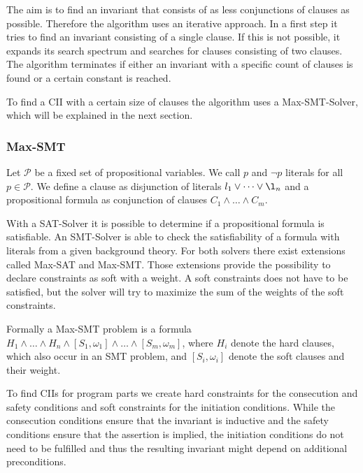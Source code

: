 The aim is to find an invariant that consists of as less conjunctions of clauses as possible.
Therefore the algorithm uses an iterative approach.
In a first step it tries to find an invariant consisting of a single clause.
If this is not possible, it expands its search spectrum and searches for clauses consisting of two clauses.
The algorithm terminates if either an invariant with a specific count of clauses is found or a certain constant is reached.



To find a CII with a certain size of clauses the algorithm uses a Max-SMT-Solver, which will be explained in the next section.

\subsubsection{Max-SMT}

Let $\mathcal{P}$ be a fixed set of propositional variables.
We call $p$ and $\neg p$ literals for all $p \in \mathcal{P}$.
We define a clause as disjunction of literals $l_1 \vee \dots \vee \l_n$ and a propositional formula as conjunction of clauses $C_1 \wedge \dots \wedge C_m$.

With a SAT-Solver it is possible to determine if a propositional formula is satisfiable.
An SMT-Solver is able to check the satisfiability of a formula with literals from a given background theory.
For both solvers there exist extensions called Max-SAT and Max-SMT.
Those extensions provide the possibility to declare constraints as soft with a weight.
A soft constraints does not have to be satisfied, but the solver will try to maximize the sum of the weights of the soft constraints.

Formally a Max-SMT problem is a formula $H_1 \wedge \dots \wedge H_n \wedge [S_1,\omega_1] \wedge \dots \wedge [S_m,\omega_m]$, where $H_i$ denote the hard clauses, which also occur in an SMT problem, and $[S_i,\omega_i]$ denote the soft clauses and their weight.

To find CIIs for program parts we create hard constraints for the consecution and safety conditions and soft constraints for the initiation conditions.
While the consecution conditions ensure that the invariant is inductive and the safety conditions ensure that the assertion is implied, the initiation conditions do not need to be fulfilled and thus the resulting invariant might depend on additional preconditions.

